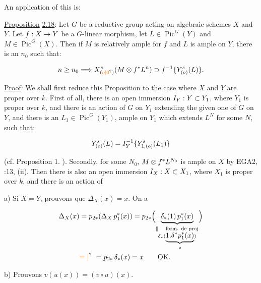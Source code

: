 An application of this is:

\uline{Proposition} \uline{2.18}: Let $G$ be a reductive group acting on algebraic schemes $X$ and $Y$. Let $f:X\to Y$ be a $G$-linear morphism, let $L\in\operatorname{Pic}^G(Y)$ and $M\in\operatorname{Pic}^G(X)$. Then if $M$ is relatively ample for $f$ and $L$ is ample on $Y$, there is an $n_0$ such that:

\[
n\geq n_0\handwritten{\Longrightarrow}X^s_{(\unsure{o|0})}(M\handwritten{\otimes}f^*L^n)\handwritten{\supset} f^{-1}\handwritten{\{}Y^s_{(o)}(L)\handwritten{\}}.
\]

\uline{Proof}: We shall first reduce this Proposition to the case where $X$ and $Y$ are proper over $k$. First of all, there is an open immersion $I_Y:Y\subset Y_1$, where $Y_1$ is proper over $k$, and there is an action of $G$ on $Y_1$ extending the given one of $G$ on $Y$, and there is an $L_1\in\operatorname{Pic}^G(Y_1)$, ample on $Y_1$ which extends $L^N$ for some $N$, such that:

\[
Y^s_{(o)}(L)=I_Y^{-1}\{Y^s_{1,(o)}(L_1)\}
\]

(cf. Proposition 1. ). Secondly, for some $N_0$, $M\otimes f^*L^{N_0}$ is ample on $X$ by EGA2, :13, (ii). Then there is also an open immersion $I_X:X\subset X_1$, where $X_1$ is proper over $k$, and there is an action of

a) Si $X=Y$, prouvons que $\Delta_X(x)=x$. On a

\[
\begin{aligned}
\Delta_X(x)&=p_{2*}(\Delta_X\,p_1^*(x))
=p_{2*}\Bigl(\underbrace{\delta_*(1)\,p_1^*(x)}_{\substack{\Vert\quad\text{form. de proj}\\\delta_*(\underbrace{1.\delta^*p_1^*(x)}_{x})}}\Bigr)\\
&\unsure{=|{}}\ =p_{2*}\,\delta_*(x)=x\qquad\text{OK.}
\end{aligned}
\]


b) Prouvons $v(u(x))=(v\circ u)(x)$.


